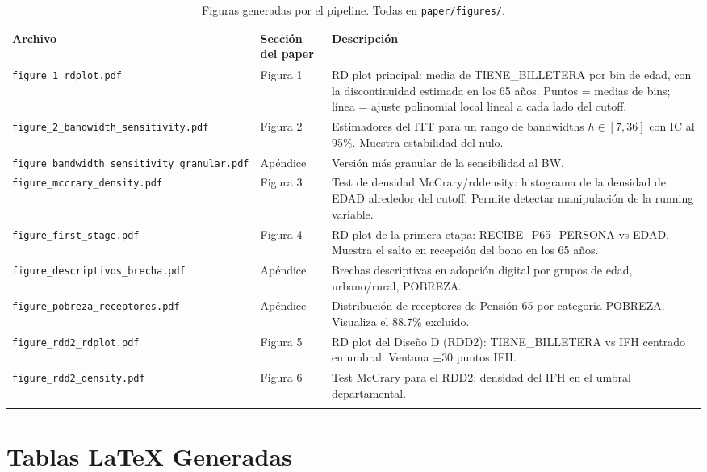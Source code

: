 \documentclass[12pt, a4paper]{article}
\begin{document}
\begin{longtable}{@{}llp{8cm}@{}}
\toprule
Archivo & Sección del paper & Descripción \\\midrule
\endhead
\texttt{figure\_1\_rdplot.pdf} & Figura 1 & RD plot principal: media de TIENE\_BILLETERA por bin de edad, con la discontinuidad estimada en los 65 años. Puntos = medias de bins; línea = ajuste polinomial local lineal a cada lado del cutoff. \\[6pt]
\texttt{figure\_2\_bandwidth\_sensitivity.pdf} & Figura 2 & Estimadores del ITT para un rango de bandwidths $h \in [7, 36]$ con IC al 95\%. Muestra estabilidad del nulo. \\[6pt]
\texttt{figure\_bandwidth\_sensitivity\_granular.pdf} & Apéndice & Versión más granular de la sensibilidad al BW. \\[6pt]
\texttt{figure\_mccrary\_density.pdf} & Figura 3 & Test de densidad McCrary/rddensity: histograma de la densidad de EDAD alrededor del cutoff. Permite detectar manipulación de la running variable. \\[6pt]
\texttt{figure\_first\_stage.pdf} & Figura 4 & RD plot de la primera etapa: RECIBE\_P65\_PERSONA vs EDAD. Muestra el salto en recepción del bono en los 65 años. \\[6pt]
\texttt{figure\_descriptivos\_brecha.pdf} & Apéndice & Brechas descriptivas en adopción digital por grupos de edad, urbano/rural, POBREZA. \\[6pt]
\texttt{figure\_pobreza\_receptores.pdf} & Apéndice & Distribución de receptores de Pensión 65 por categoría POBREZA. Visualiza el 88.7\% excluido. \\[6pt]
\texttt{figure\_rdd2\_rdplot.pdf} & Figura 5 & RD plot del Diseño D (RDD2): TIENE\_BILLETERA vs IFH centrado en umbral. Ventana $\pm 30$ puntos IFH. \\[6pt]
\texttt{figure\_rdd2\_density.pdf} & Figura 6 & Test McCrary para el RDD2: densidad del IFH en el umbral departamental. \\
\bottomrule
\caption{Figuras generadas por el pipeline. Todas en \texttt{paper/figures/}.}
\end{longtable}

\section{Tablas LaTeX Generadas}
\end{document}
